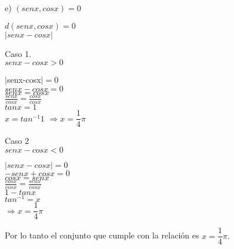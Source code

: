 \documentclass[12pt,a4paper,scrartcl]{article}
\begin{document}
{\pagebreak

e) $(senx,cosx)=0$\\
\begin{center}
$d(senx,cosx)=0$\\
$\rvert senx-cosx \lvert$\\
\begin{flushleft}
Caso 1.\\ $senx-cosx>0$
\end{flushleft}
$\lvert $senx-cosx$ \lvert = 0$\\
$senx-cosx=0$\\
$senx=cosx$\\
$\frac{senx}{cosx}=\frac{cosx}{cosx}$\\
$tanx=1$\\
$x=tan^{-1}1$
$\Rightarrow x=\dfrac{1}{4}\pi$
\end{center}
Caso 2\\
$senx-cosx<0$\\
\begin{center}

$\lvert senx-cosx \lvert=0$\\
$-senx+cosx=0$\\
$cosx=senx$\\
$\frac{cosx}{cosx}=\frac{senx}{cosx}$\\
$1-tanx$\\
$tan^{-1}=x$\\
$\Rightarrow x=\dfrac{1}{4}\pi$
\end{center}
Por lo tanto el conjunto que cumple con la relaci\'on es $x=\dfrac{1}{4}\pi.$

}
\end{document}
